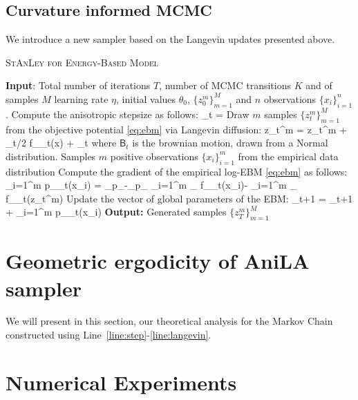 \documentclass{article}
\begin{document}
\subsection{Curvature informed MCMC}

We introduce a new sampler based on the Langevin updates presented above.

\begin{algorithm}[H]
\caption{\textsc{StAnLey for Energy-Based Model}} \label{alg:anila}
\begin{algorithmic}[1]
\STATE \textbf{Input}: Total number of iterations $T$, number of MCMC transitions $K$ and of samples $M$ learning rate $\eta$, initial values $\theta_0$, $\{ z_{0}^m \}_{m=1}^M$ and $n$ observations $\{ x_{i} \}_{i=1}^n$.
\STATE Compute the anisotropic stepsize as follows: \label{line:step}
\beq
\stepsize_t = 
\eeq
\STATE Draw $m$ samples $\{ z_{t}^m \}_{m=1}^M$ from the objective potential \eqref{eq:ebm} via Langevin diffusion:\label{line:langevin}
\beq
z_{t}^m = z_{t}^m + \stepsize_t/2  \nabla f_{\theta_t}(x) + \sqrt{\stepsize} _t
\eeq
where $\mathsf{B}_t$ is the brownian motion, drawn from a Normal distribution.
\STATE Samples $m$ positive observations $\{ x_{i} \}_{i=1}^m$ from the empirical data distribution
\STATE Compute the gradient of the empirical log-EBM \eqref{eq:ebm} as follows:
\beq
\nabla \sum_{i=1}^m \log p_{\theta_t}(x_i) = _{p_{}}-_{p_{\theta}} \approx {} \sum_{i=1}^{m} \nabla_{\theta} f_{\theta_t}\left(x_{i}\right)- \sum_{i=1}^{m} \nabla_{\theta} f_{\theta_t}\left(z_t^m\right)
\eeq
\STATE Update the vector of global parameters of the EBM:
\beq
\theta_{t+1} = \theta_{t+1} + \eta \nabla \sum_{i=1}^m \log p_{\theta_t}(x_i)
\eeq
\ENDFOR
\STATE \textbf{Output:} Generated samples $\{ z_{T}^m \}_{m=1}^M$
\end{algorithmic}
\end{algorithm}



\section{Geometric ergodicity of AniLA sampler}
We will present in this section, our theoretical analysis for the Markov Chain constructed using Line~\ref{line:step}-\ref{line:langevin}. 


\section{Numerical Experiments}
\end{document}
